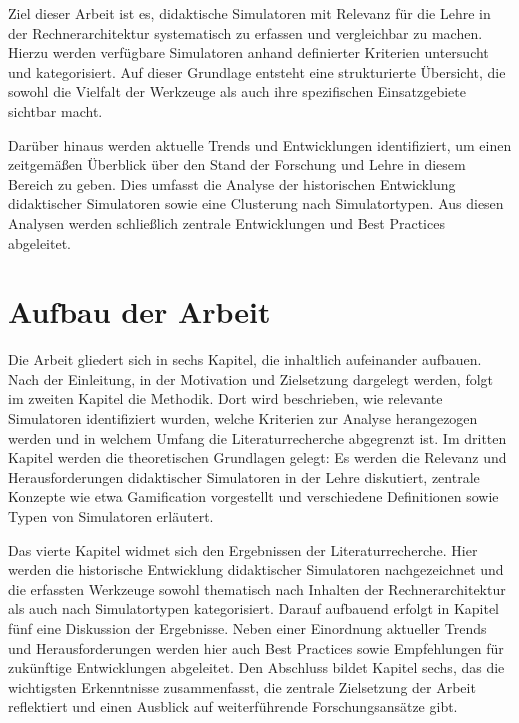 Ziel dieser Arbeit ist es, didaktische Simulatoren mit Relevanz für die Lehre in der Rechnerarchitektur systematisch zu erfassen und vergleichbar zu machen. Hierzu werden verfügbare Simulatoren anhand definierter Kriterien untersucht und kategorisiert. Auf dieser Grundlage entsteht eine strukturierte Übersicht, die sowohl die Vielfalt der Werkzeuge als auch ihre spezifischen Einsatzgebiete sichtbar macht.

Darüber hinaus werden aktuelle Trends und Entwicklungen identifiziert, um einen zeitgemäßen Überblick über den Stand der Forschung und Lehre in diesem Bereich zu geben. Dies umfasst die Analyse der historischen Entwicklung didaktischer Simulatoren sowie eine Clusterung nach Simulatortypen. Aus diesen Analysen werden schließlich zentrale Entwicklungen und Best Practices abgeleitet.

\section{Aufbau der Arbeit}

Die Arbeit gliedert sich in sechs Kapitel, die inhaltlich aufeinander aufbauen. Nach der Einleitung, in der Motivation und Zielsetzung dargelegt werden, folgt im zweiten Kapitel die Methodik. Dort wird beschrieben, wie relevante Simulatoren identifiziert wurden, welche Kriterien zur Analyse herangezogen werden und in welchem Umfang die Literaturrecherche abgegrenzt ist. Im dritten Kapitel werden die theoretischen Grundlagen gelegt: Es werden die Relevanz und Herausforderungen didaktischer Simulatoren in der Lehre diskutiert, zentrale Konzepte wie etwa Gamification vorgestellt und verschiedene Definitionen sowie Typen von Simulatoren erläutert.

Das vierte Kapitel widmet sich den Ergebnissen der Literaturrecherche. Hier werden die historische Entwicklung didaktischer Simulatoren nachgezeichnet und die erfassten Werkzeuge sowohl thematisch nach Inhalten der Rechnerarchitektur als auch nach Simulatortypen kategorisiert. Darauf aufbauend erfolgt in Kapitel fünf eine Diskussion der Ergebnisse. Neben einer Einordnung aktueller Trends und Herausforderungen werden hier auch Best Practices sowie Empfehlungen für zukünftige Entwicklungen abgeleitet. Den Abschluss bildet Kapitel sechs, das die wichtigsten Erkenntnisse zusammenfasst, die zentrale Zielsetzung der Arbeit reflektiert und einen Ausblick auf weiterführende Forschungsansätze gibt.
